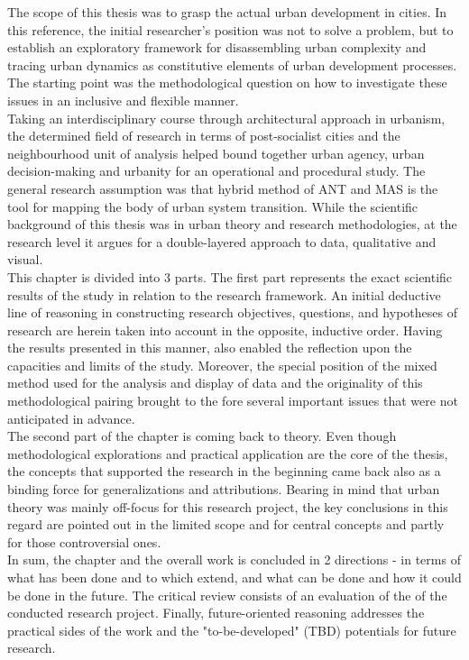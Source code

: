\documentclass[11pt]{report}
\begin{document}
The scope of this thesis was to grasp the actual urban development  in cities.
In this reference, the initial researcher's position was not to solve a problem, but to establish an exploratory framework for disassembling urban complexity and tracing urban dynamics as constitutive elements of urban development processes.
The starting point was the methodological question on how to investigate these issues in an inclusive and flexible manner.
\\
Taking an interdisciplinary course through architectural approach in urbanism, the determined field of research in terms of post-socialist cities and the neighbourhood unit of analysis helped bound together urban agency, urban decision-making and urbanity for an operational and procedural study.
The general research assumption was that hybrid method of ANT and MAS
is the tool for mapping the body of urban system transition.
While the scientific background of this thesis was in urban theory and research methodologies, at the research level it argues for a double-layered approach to data, qualitative and visual.  
\\
This chapter is divided into 3 parts. 
The first part represents the exact scientific results of the study in relation to the research framework.
An initial deductive line of reasoning in constructing research objectives, questions, and hypotheses of research are herein taken into account in the opposite, inductive order.
Having the results presented in this manner, also enabled the reflection upon the capacities and limits of the study.
Moreover, the special position of the mixed method used for the analysis and display of data and the originality of this methodological pairing brought to the fore several important issues that were not anticipated in advance.
\\
The second part of the chapter is coming back to theory.
Even though methodological explorations and practical application are the core of the thesis, the concepts that supported the research in the beginning came back also as a binding force for generalizations and attributions.
Bearing in mind that urban theory was mainly off-focus for this research project, the key conclusions in this regard are pointed out in the limited scope and for central concepts and partly for those controversial ones.
\\
In sum, the chapter and the overall work is concluded in 2 directions - in terms of what has been done and to which extend, and what can be done and how it could be done in the future.
The critical review consists of an evaluation of the of the conducted research project.
Finally, future-oriented reasoning addresses the practical sides of the work and the "to-be-developed" (TBD) potentials for future research.
\end{document}
